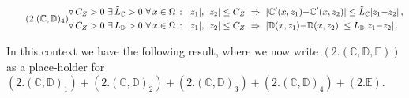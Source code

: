 \documentclass[a4paper,10pt,reqno]{amsart}
\numberwithin{equation}{section}
\numberwithin{equation}{section}
\newcommand{\bbC}{\mathbb{C}}
\newcommand{\bbD}{\mathbb{D}}
\newcommand{\bbE}{\mathbb{E}}
\begin{document}
  \begin{equation}
\label{elast-visc-tensors-4} 
\tag{2.${\small (\bbC,\bbD)_4}$}
\begin{aligned}
&
\forall\, C_Z>0  \ 
\exists\, \tilde{L}_{\bbC}>0 \  \forall\, x\in \Omega \, :
 \ |z_1|,\, |z_2|  \leq C_Z \ \Rightarrow 
 \  | \bbC'(x,z_1){-} \bbC'(x,z_2) | \leq \tilde{L}_{\bbC} |z_1{-}z_2|\,,
\\
& 
\forall\, C_Z>0  \ 
\exists\, L_{\bbD}>0 \  \forall\, x\in \Omega \, :
 \ |z_1|,\, |z_2|  \leq C_Z \ \Rightarrow 
 \  | \bbD(x,z_1){-} \bbD(x,z_2) | \leq L_{\bbD} |z_1{-}z_2|\,.
\end{aligned}
\end{equation}
  \par
  In this context we have the following result, where we now write $(2.(\bbC,\bbD,\bbE))$ as a place-holder for 
  $(2.(\bbC,\bbD)_1) + (2.(\bbC,\bbD)_2) + (2.(\bbC,\bbD)_3) + (2.(\bbC,\bbD)_4) + (2.\bbE)$. 
\end{document}
